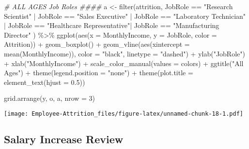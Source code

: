 \documentclass[
]{article}
\newenvironment{Shaded}{\begin{snugshade}}{\end{snugshade}}
\newcommand{\AttributeTok}[1]{\textcolor[rgb]{0.77,0.63,0.00}{#1}}
\newcommand{\CommentTok}[1]{\textcolor[rgb]{0.56,0.35,0.01}{\textit{#1}}}
\newcommand{\DecValTok}[1]{\textcolor[rgb]{0.00,0.00,0.81}{#1}}
\newcommand{\FloatTok}[1]{\textcolor[rgb]{0.00,0.00,0.81}{#1}}
\newcommand{\FunctionTok}[1]{\textcolor[rgb]{0.00,0.00,0.00}{#1}}
\newcommand{\NormalTok}[1]{#1}
\newcommand{\OtherTok}[1]{\textcolor[rgb]{0.56,0.35,0.01}{#1}}
\newcommand{\SpecialCharTok}[1]{\textcolor[rgb]{0.00,0.00,0.00}{#1}}
\newcommand{\StringTok}[1]{\textcolor[rgb]{0.31,0.60,0.02}{#1}}
\begin{document}
\begin{Shaded}
\begin{Highlighting}[]
\CommentTok{\# ALL AGES Job Roles \#\#\#\#}
\NormalTok{a }\OtherTok{\textless{}{-}} \FunctionTok{filter}\NormalTok{(attrition, JobRole }\SpecialCharTok{==} \StringTok{"Research Scientist"} \SpecialCharTok{|}\NormalTok{ JobRole }\SpecialCharTok{==} \StringTok{"Sales Executive"}  \SpecialCharTok{|}\NormalTok{ JobRole }\SpecialCharTok{==} \StringTok{"Laboratory Technician"} \SpecialCharTok{|}\NormalTok{ JobRole }\SpecialCharTok{==} \StringTok{"Healthcare Representative"}\SpecialCharTok{|}\NormalTok{ JobRole }\SpecialCharTok{==} \StringTok{"Manufacturing Director"}\NormalTok{ ) }\SpecialCharTok{\%\textgreater{}\%}
  \FunctionTok{ggplot}\NormalTok{(}\FunctionTok{aes}\NormalTok{(}\AttributeTok{x =}\NormalTok{ MonthlyIncome, }\AttributeTok{y =}\NormalTok{ JobRole, }\AttributeTok{color =}\NormalTok{ Attrition)) }\SpecialCharTok{+}
  \FunctionTok{geom\_boxplot}\NormalTok{() }\SpecialCharTok{+}
  \FunctionTok{geom\_vline}\NormalTok{(}\FunctionTok{aes}\NormalTok{(}\AttributeTok{xintercept =} \FunctionTok{mean}\NormalTok{(MonthlyIncome)), }\AttributeTok{color =} \StringTok{"black"}\NormalTok{, }\AttributeTok{linetype =} \StringTok{"dashed"}\NormalTok{) }\SpecialCharTok{+}
  \FunctionTok{ylab}\NormalTok{(}\StringTok{"JobRole"}\NormalTok{) }\SpecialCharTok{+}
  \FunctionTok{xlab}\NormalTok{(}\StringTok{"MonthlyIncome"}\NormalTok{) }\SpecialCharTok{+}
  \FunctionTok{scale\_color\_manual}\NormalTok{(}\AttributeTok{values =}\NormalTok{ colors) }\SpecialCharTok{+}
  \FunctionTok{ggtitle}\NormalTok{(}\StringTok{"All Ages"}\NormalTok{) }\SpecialCharTok{+}
  \FunctionTok{theme}\NormalTok{(}\AttributeTok{legend.position =} \StringTok{"none"}\NormalTok{) }\SpecialCharTok{+}
  \FunctionTok{theme}\NormalTok{(}\AttributeTok{plot.title =} \FunctionTok{element\_text}\NormalTok{(}\AttributeTok{hjust =} \FloatTok{0.5}\NormalTok{)) }

\FunctionTok{grid.arrange}\NormalTok{(y, o, a, }\AttributeTok{nrow =} \DecValTok{3}\NormalTok{)}
\end{Highlighting}
\end{Shaded}

\texttt{[image: Employee-Attrition\_files/figure-latex/unnamed-chunk-18-1.pdf]}

\hypertarget{salary-increase-review}{%
\subsection{Salary Increase Review}\label{salary-increase-review}}
\end{document}
